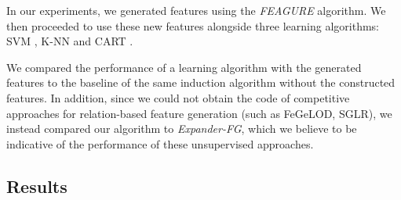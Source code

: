 \documentclass{article}
\theoremstyle{definition}
\begin{document}
In our experiments, we generated features using the \emph{FEAGURE} algorithm. We then proceeded to use these new features alongside three learning algorithms: SVM \citep{cortes1995support}, K-NN \citep{fix1951discriminatory} and CART \citep{breiman1984classification}.

We compared the performance of a learning algorithm with the generated features to the baseline of the same induction algorithm without the constructed features.
In addition, since we could not obtain the code of competitive approaches for relation-based feature generation (such as FeGeLOD, SGLR), we instead compared our algorithm to \emph{Expander-FG}, which we believe to be indicative of the performance of these unsupervised approaches.






\subsection{Results}
\end{document}
